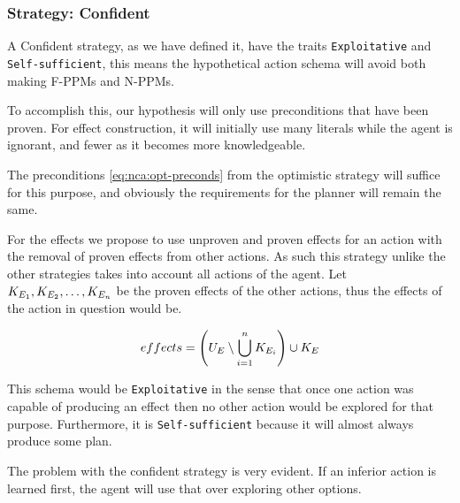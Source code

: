 \documentclass[\master/Master.tex]{subfiles}
\begin{document}
\subsubsection{Strategy: Confident}

A Confident strategy, as we have defined it, have the traits \texttt{Exploitative} and \texttt{Self-sufficient},
this means the hypothetical action schema will avoid both making F-PPMs and N-PPMs. 

To accomplish this, our hypothesis will only use preconditions that have been proven.
For effect construction, it will initially use many literals while the agent is ignorant, and fewer as it becomes more knowledgeable. 

The preconditions \eqref{eq:nca:opt-preconds} from the optimistic strategy will suffice for this purpose, and obviously the requirements for the planner will remain the same.

For the effects we propose to use unproven and proven effects for an action with the removal of proven effects from other actions. 
As such this strategy unlike the other strategies takes into account all actions of the agent.
Let $K_{E_1},K_{E_2},\dots,K_{E_n}$ be the proven effects of the other actions, thus the effects of the action in question would be.

\begin{equation}
		effects = \left( U_E \setminus \bigcup \limits_{i = 1} ^n K_{E_i} \right) \cup K_E
\end{equation}

This schema would be \texttt{Exploitative} in the sense that once one action was capable of producing an effect then no other action would be explored for that purpose. 
Furthermore, it is \texttt{Self-sufficient} because it will almost always produce some plan.

The problem with the confident strategy is very evident. If an inferior action is learned first, the agent will use that over exploring other options.
\end{document}
